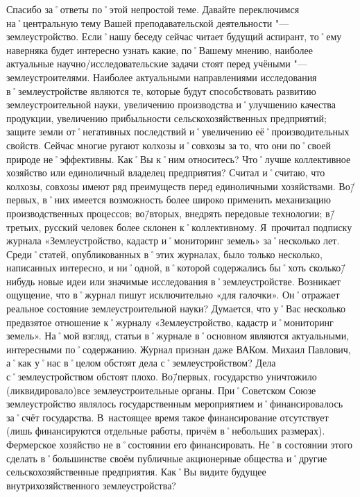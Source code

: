 \begin{drama}
	\maxspeaks Спасибо за˚ответы по˚этой непростой теме. Давайте переключимся на˚центральную тему Вашей преподавательской деятельности "--- землеустройство.
Если˚нашу беседу сейчас читает будущий аспирант, то˚ему наверняка будет интересно узнать какие, по˚Вашему мнению, наиболее актуальные научно\-/исследовательские задачи стоят перед учёными "--- землеустроителями.
	\michaelspeaks Наиболее актуальными направлениями исследования в˚землеустройстве являются те, которые будут способствовать развитию землеустроительной науки, увеличению производства и˚улучшению качества продукции, увеличению прибыльности сельскохозяйственных предприятий; защите земли от˚негативных последствий и˚увеличению её˚производительных свойств.
	\maxspeaks Сейчас многие ругают колхозы и˚совхозы за то, что они по˚своей природе не˚эффективны. Как˚Вы к˚ним относитесь? Что˚лучше коллективное хозяйство или единоличный владелец предприятия?
	\michaelspeaks Считал и˚считаю, что колхозы, совхозы имеют ряд преимуществ перед единоличными хозяйствами. Во\=/первых, в˚них имеется возможность более широко применить механизацию производственных процессов; во\=/вторых, внедрять передовые технологии; в\=/третьих, русский человек более склонен к˚коллективному.
	\maxspeaks Я~прочитал подписку журнала «Землеустройство, кадастр и˚мониторинг земель» за˚несколько лет. Среди˚статей, опубликованных в˚этих журналах, было только несколько, написанных интересно, и ни˚одной, в˚которой содержались бы˚хоть сколько\=/нибудь новые идеи или значимые исследования в˚землеустройстве. Возникает ощущение, что в˚журнал пишут исключительно  «для галочки». Он˚отражает реальное состояние землеустроительной науки?
	\michaelspeaks Думается, что у˚Вас несколько предвзятое отношение к˚журналу «Землеустройство, кадастр и˚мониторинг земель». На˚мой взгляд, статьи в˚журнале в˚основном являются актуальными, интересными по˚содержанию. Журнал признан даже ВАКом. 
	\maxspeaks Михаил Павлович, а˚как у˚нас в˚целом обстоят дела с˚землеустройством?
	\michaelspeaks Дела с˚землеустройством обстоят плохо. Во\=/первых, государство уничтожило (ликвидировало)все землеустроительные органы. При˚Советском Союзе землеустройство являлось государственным мероприятием и˚финансировалось за˚счёт государства. В~настоящее время такое финансирование отсутствует (лишь финансируются отдельные работы, причём в˚небольших размерах). Фермерское хозяйство не в˚состоянии его финансировать. Не˚в состоянии этого сделать в˚большинстве своём публичные акционерные общества и˚другие сельскохозяйственные предприятия.
	\maxspeaks Как˚Вы видите будущее внутрихозяйственного землеустройства?

\end{drama}
